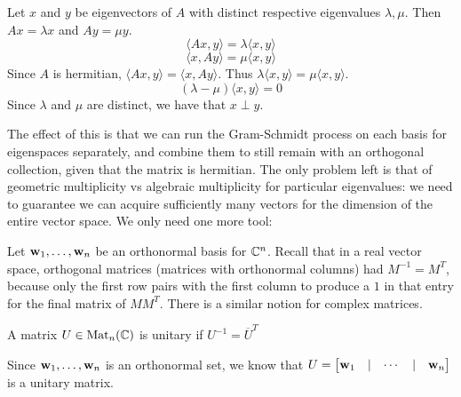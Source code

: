 \documentclass{article}
\begin{document}
    \pf Let $x$ and $y$ be eigenvectors of $A$ with distinct respective eigenvalues $\lambda, \mu$. Then $Ax = \lambda x$ and $Ay = \mu y$.
    \[\langle Ax, y \rangle = \lambda \langle x, y \rangle\]
    \[\langle x, Ay \rangle = \mu \langle x, y \rangle\]
    Since $A$ is hermitian, $\langle Ax, y \rangle = \langle x, Ay \rangle$.
    Thus $\lambda\langle x, y \rangle = \mu\langle x, y \rangle$.
    \[(\lambda - \mu)\langle x, y \rangle = 0\]
    Since $\lambda$ and $\mu$ are distinct, we have that $x \perp y$. \vspace{1em}

    The effect of this is that we can run the Gram-Schmidt process on each basis for eigenspaces separately, and combine them to still remain with an orthogonal collection, given that the matrix is hermitian. The only problem left is that of geometric multiplicity vs algebraic multiplicity for particular eigenvalues: we need to guarantee we can acquire sufficiently many vectors for the dimension of the entire vector space. We only need one more tool: \vspace{1em}

    Let $\mathbf{w}_1, \ldots, \mathbf{w}_n$ be an orthonormal basis for $\mathbb{C}^n$. Recall that in a real vector space, orthogonal matrices (matrices with orthonormal columns) had $M^{-1} = M^T$, because only the first row pairs with the first column to produce a $1$ in that entry for the final matrix of $MM^T$. There is a similar notion for complex matrices.
    \begin{definition}
        A matrix $U \in \operatorname{Mat}_n(\mathbb{C})$ is unitary if $U^{-1} = \overline{U}^T$
    \end{definition}
    Since $\mathbf{w}_1, \ldots, \mathbf{w}_n$ is an orthonormal set, we know that $U = \begin{bmatrix}
        \mathbf{w}_1 & | & \cdots & | & \mathbf{w}_n
    \end{bmatrix}$
    is a unitary matrix.
\end{document}
